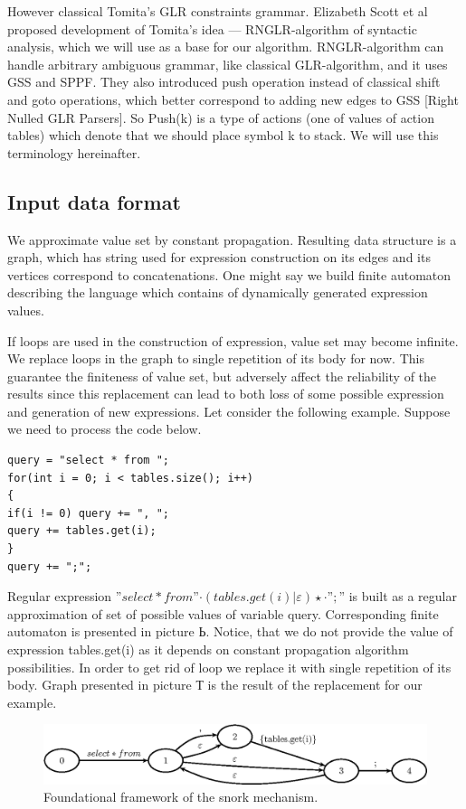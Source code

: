 \documentclass{sigplanconf}
\begin{document}
However classical Tomita’s GLR constraints grammar. Elizabeth Scott et al proposed development of Tomita’s idea — RNGLR-algorithm of syntactic analysis, which we will use as a base for our algorithm. RNGLR-algorithm can handle arbitrary ambiguous grammar, like classical GLR-algorithm, and it uses GSS and SPPF. They also introduced push operation instead of classical shift and goto operations, which better correspond to adding new edges to GSS [Right Nulled GLR Parsers]. So Push(k) is a type of actions (one of values of action tables) which denote that we should place symbol k to stack.  We will use this terminology hereinafter.

\subsection{Input data format}
We approximate value set by constant propagation. Resulting data structure is a graph, which has string used for expression construction on its edges and its vertices correspond to concatenations. One might say we build finite automaton describing the language which contains of dynamically generated expression values.

If loops are used in the construction of expression, value set may become infinite. We replace loops in the graph to single repetition of its body for now. This guarantee the finiteness of value set, but adversely affect the reliability of the results since this replacement can lead to both loss of some possible expression and generation of new expressions. Let consider the following example. Suppose we need to process the code below.

\begin{verbatim}
query = "select * from ";
for(int i = 0; i < tables.size(); i++)
{
if(i != 0) query += ", ";
query += tables.get(i);
}
query += ";";
\end{verbatim}

	Regular expression $”select * from ” · ({tables.get(i)}|\varepsilon) \star \cdot ”;”$ is built as a regular approximation of set of possible values of variable query. Corresponding finite automaton is presented in picture Ь. Notice, that we do not provide the value of expression {tables.get(i)} as it depends on constant propagation algorithm possibilities. In order to get rid of loop we replace it with single repetition of its body. Graph presented in picture Т is the result of the replacement for our example.


\begin{figure}
    \begin{center}
        \includegraphics[scale=0.5]{Graphs/cyclesOrig.eps}
    \end{center}
    \caption{Foundational framework of the snork mechanism.}
    \label{fig-ffsm}
\end{figure}
\end{document}
